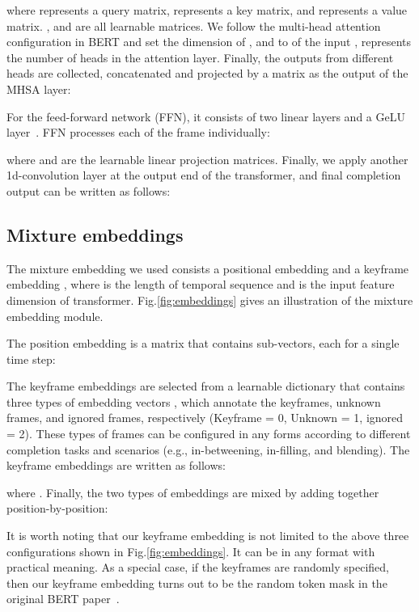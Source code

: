 \documentclass[10pt,twocolumn,letterpaper]{article}
\begin{document}
where  represents a query matrix,  represents a key matrix, and  represents a value matrix. ,  and  are all learnable matrices. We follow the multi-head attention configuration in BERT and set the dimension of ,  and  to  of the input ,  represents the number of heads in the attention layer. Finally, the outputs from different heads are collected, concatenated and projected by a matrix  as the output of the MHSA layer:



For the feed-forward network (FFN), it consists of two linear layers and a GeLU layer~\cite{hendrycks2016gelu}. FFN processes each of the frame individually:

where  and  are the learnable linear projection matrices.
Finally, we apply another 1d-convolution layer at the output end of the transformer, and final completion output  can be written as follows:



\subsection{Mixture embeddings}

The mixture embedding  we used consists a positional embedding  and a keyframe embedding , where  is the length of temporal sequence and  is the input feature dimension of transformer. Fig.\ref{fig:embeddings} gives an illustration of the mixture embedding module.

The position embedding  is a matrix that contains  sub-vectors, each for a single time step: 

The keyframe embeddings  are selected from a learnable  dictionary  that contains three types of embedding vectors , which annotate the keyframes, unknown frames, and ignored frames, respectively (Keyframe = 0, Unknown = 1, ignored = 2). These types of frames can be configured in any forms according to different completion tasks and scenarios (e.g., in-betweening, in-filling, and blending). The keyframe embeddings are written as follows:

where . Finally, the two types of embeddings are mixed by adding together position-by-position:

It is worth noting that our keyframe embedding is not limited to the above three configurations shown in Fig.\ref{fig:embeddings}. It can be in any format with practical meaning. As a special case, if the keyframes are randomly specified, then our keyframe embedding turns out to be the random token mask in the original BERT paper~\cite{devlin2018bert}.
\end{document}
